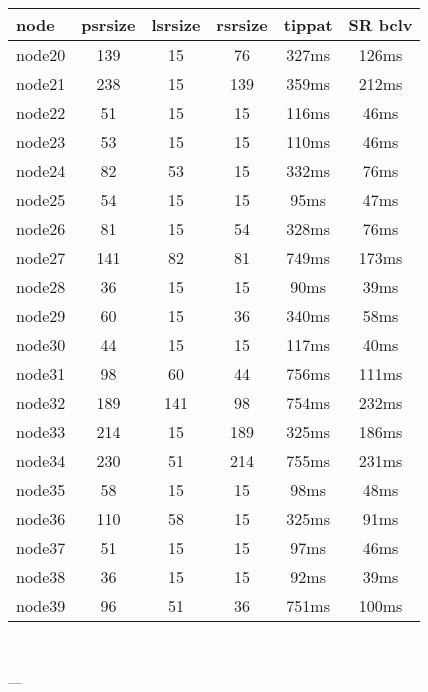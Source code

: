 \begin{tabular}{|l|c|c|c|c|c|}
\hline node & psrsize & lsrsize & rsrsize   & tippat & SR bclv\\
    \hline node20 & 139 & 15 & 76 & 327ms & 126ms\\
    \hline node21 & 238 & 15 & 139 & 359ms & 212ms\\
    \hline node22 & 51 & 15 & 15 & 116ms & 46ms\\
    \hline node23 & 53 & 15 & 15 & 110ms & 46ms\\
    \hline node24 & 82 & 53 & 15 & 332ms & 76ms\\
    \hline node25 & 54 & 15 & 15 & 95ms & 47ms\\
    \hline node26 & 81 & 15 & 54 & 328ms & 76ms\\
    \hline node27 & 141 & 82 & 81 & 749ms & 173ms\\
    \hline node28 & 36 & 15 & 15 & 90ms & 39ms\\
    \hline node29 & 60 & 15 & 36 & 340ms & 58ms\\
    \hline node30 & 44 & 15 & 15 & 117ms & 40ms\\
    \hline node31 & 98 & 60 & 44 & 756ms & 111ms\\
    \hline node32 & 189 & 141 & 98 & 754ms & 232ms\\
    \hline node33 & 214 & 15 & 189 & 325ms & 186ms\\
    \hline node34 & 230 & 51 & 214 & 755ms & 231ms\\
    \hline node35 & 58 & 15 & 15 & 98ms & 48ms\\
    \hline node36 & 110 & 58 & 15 & 325ms & 91ms\\
    \hline node37 & 51 & 15 & 15 & 97ms & 46ms\\
    \hline node38 & 36 & 15 & 15 & 92ms & 39ms\\
    \hline node39 & 96 & 51 & 36 & 751ms & 100ms\\

\hline
\end{tabular} \

---


